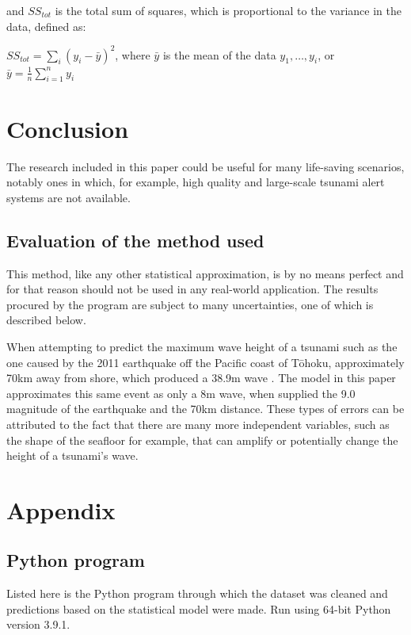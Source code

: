 \documentclass[11pt,letterpaper]{article}
\begin{document}
and $SS_{tot}$ is the total sum of squares, which is proportional to the variance in the data, 
defined as:

$SS_{tot} = \sum_{i} (y_i - \bar y)^2$, where $\bar y$ is the mean of the data $y_1,\dots, y_i$, 
or $\bar y = \frac{1}{n} \sum_{i=1}^n y_i$



\section{Conclusion}

The research included in this paper could be useful for many life-saving scenarios,
notably ones in which, for example, high quality and large-scale tsunami alert
systems are not available.

\subsection{Evaluation of the method used}

This method, like any other statistical approximation, is by no means perfect
and for that reason should not be used in any real-world application. The results
procured by the program are subject to many uncertainties, one of which is described
below.

When attempting to predict the maximum wave height of a tsunami such as the one
caused by the 2011 earthquake off the Pacific coast of Tōhoku, approximately 70km
away from shore, which produced a 38.9m wave \cite{yomiuri_2011}. The model in this
paper approximates this same event as only a 8m wave, when supplied the 9.0 magnitude
of the earthquake and the 70km distance. These types of errors can be attributed to the
fact that there are many more independent variables, such as the shape of the seafloor for
example, that can amplify or potentially change the height of a tsunami's wave.


\printbibliography[heading=bibintoc, title=Works Cited]

\appendix
\section{Appendix}
\label{app}
\subsection{Python program}
\label{app:scripts}

Listed here is the Python program through which the dataset was cleaned and
predictions based on the statistical model were made. Run using 64-bit Python
version 3.9.1.


\end{document}
